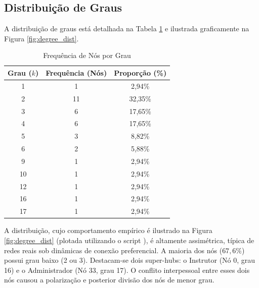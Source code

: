 \documentclass[sigconf,nonacm]{webmedia}
\begin{document}
\subsection{Distribuição de Graus}
\label{sec:degree_dist}

A distribuição de graus está detalhada na Tabela \ref{tab:degree_freq} e ilustrada graficamente na Figura \ref{fig:degree_dist}.

\begin{table}[h]
  \caption{Frequência de Nós por Grau}
  \label{tab:degree_freq}
  \begin{tabular}{ccc}
    \toprule
    Grau ($k$) & Frequência (Nós) & Proporção (\%) \\
    \midrule
    1 & 1 & 2,94\% \\
    2 & 11 & 32,35\% \\
    3 & 6 & 17,65\% \\
    4 & 6 & 17,65\% \\
    5 & 3 & 8,82\% \\
    6 & 2 & 5,88\% \\
    9 & 1 & 2,94\% \\
    10 & 1 & 2,94\% \\
    12 & 1 & 2,94\% \\
    16 & 1 & 2,94\% \\
    17 & 1 & 2,94\% \\
    \bottomrule
  \end{tabular}
\end{table}

A distribuição, cujo comportamento empírico é ilustrado na Figura \ref{fig:degree_dist} (plotada utilizando o script ), é altamente assimétrica, típica de redes reais sob dinâmicas de conexão preferencial. A maioria dos nós ($67,6\%$) possui grau baixo (2 ou 3). Destacam-se dois super-hubs: o Instrutor (Nó 0, grau 16) e o Administrador (Nó 33, grau 17). O conflito interpessoal entre esses dois nós causou a polarização e posterior divisão dos nós de menor grau.
\end{document}
